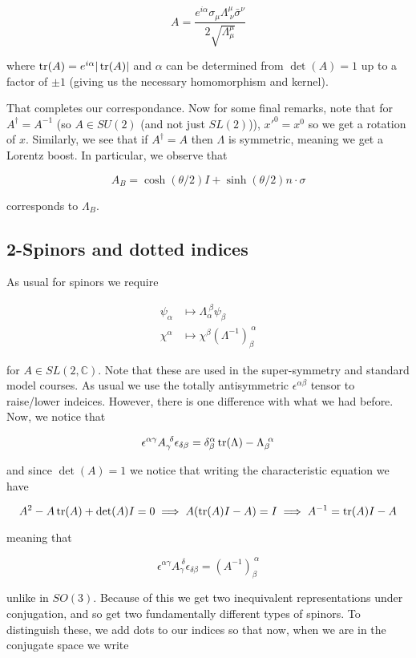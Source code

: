 \documentclass{article}
\theoremstyle{definition}
\begin{document}
$$ A = \frac{e^{i\alpha} \sigma_\mu \Lambda^\mu_{\ \nu} \bar{\sigma}^\nu}{2
  \sqrt{\Lambda^\mu_\mu}} $$

where $\tr(A) = e^{i\alpha} |\tr(A)|$ and $\alpha$ can be determined from
$\det(A) = 1$ up to a factor of $\pm1$ (giving us the necessary homomorphism and
kernel). 

That completes our correspondance. Now for some final remarks, note that for
$A^\dagger = A^{-1}$ (so $A \in SU(2)$ (and not just $SL(2)$)), $x'^0 = x^0$ so
we get a rotation of $x$. Similarly, we see that if $A^\dagger = A$ then
$\Lambda$ is symmetric, meaning we get a Lorentz boost. In particular, we
observe that

$$ A_B = \cosh(\theta / 2) I + \sinh(\theta / 2) n \cdot \sigma $$ 

corresponds to $\Lambda_B$. 

\subsection{2-Spinors and dotted indices}

As usual for spinors we require

\begin{align*}
\psi_\alpha &\mapsto \Lambda_\alpha^{\ \beta} \psi_\beta \\
\chi^\alpha &\mapsto \chi^\beta (\Lambda^{-1})_\beta^{\ \alpha}
\end{align*}

for $A \in SL(2, \mathbb{C})$. Note that these are used in the super-symmetry
and standard model courses. As usual we use the totally antisymmetric
$\epsilon^{\alpha \beta}$ tensor to raise/lower indeices. However, there is one
difference with what we had before. Now, we notice that

$$ \epsilon^{\alpha \gamma} A_\gamma^{\ \delta} \epsilon_{\delta \beta} =
\delta_\beta^\alpha \tr(\Lambda) - \Lambda_\beta^{\ \alpha} $$

and since $\det(A) = 1$ we notice that writing the characteristic equation we
have 

$$ A^2 - A \tr(A) + \det(A) I = 0 \implies A(\tr(A) I - A) = I \implies A^{-1} =
\tr(A) I - A $$

meaning that

$$ \epsilon^{\alpha \gamma} A_\gamma^{\ \delta} \epsilon_{\delta \beta} =
(A^{-1})_\beta^{\ \alpha} $$

unlike in $SO(3)$. Because of this we get two inequivalent representations under
conjugation, and so get two fundamentally different types of spinors. To
distinguish these, we add dots to our indices so that now, when we are in the
conjugate space we write
\end{document}
